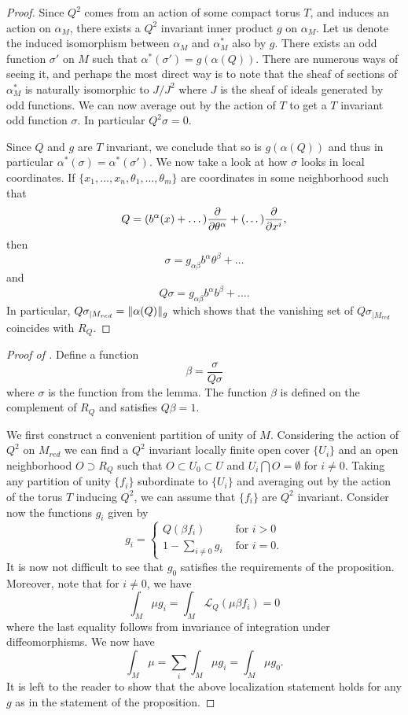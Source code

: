 \documentclass[11pt]{amsart}
\numberwithin{equation}{section}
\numberwithin{figure}{section}
\theoremstyle{plain}
\theoremstyle{definition}
\theoremstyle{remark}
\begin{document}
\begin{proof}
Since $Q^{2}$ comes from an action of some compact torus $T$, and
induces an action on $\alpha_{M}$, there exists a $Q^{2}$ invariant
inner product $g$ on $\alpha_{M}$. Let us denote the induced isomorphism
between $\alpha_{M}$ and $\alpha_{M}^{*}$ also by $g$. There exists
an odd function $\sigma'$ on $M$ such that $\alpha^{*}(\sigma')=g(\alpha(Q))$.
There are numerous ways of seeing it, and perhaps the most direct
way is to note that the sheaf of sections of $\alpha_{M}^{*}$ is
naturally isomorphic to $J/J^{2}$ where $J$ is the sheaf of ideals
generated by odd functions. We can now average out by the action of
$T$ to get a $T$ invariant odd function $\sigma$. In particular
$Q^{2}\sigma=0$.

Since $Q$ and $g$ are $T$ invariant, we conclude that so is $g(\alpha(Q))$
and thus in particular $\alpha^{*}(\sigma)=\alpha^{*}(\sigma')$.
We now take a look at how $\sigma$ looks in local coordinates. If
$\{x_{1},\dots,x_{n},\theta_{1},\dots,\theta_{m}\}$ are coordinates
in some neighborhood such that 
\[
Q=(b^{\alpha}(x)+\dots)\frac{\partial}{\partial\theta^{\alpha}}+(\dots)\frac{\partial}{\partial x^{i}},
\]
then 
\[
\sigma=g_{\alpha\beta}b^{\alpha}\theta^{\beta}+\dots
\]
and 
\[
Q\sigma=g_{\alpha\beta}b^{\alpha}b^{\beta}+\dots.
\]
In particular, $Q\sigma_{|M_{red}}=\lVert\alpha(Q)\rVert_{g}$ which shows
that the vanishing set of $Q\sigma_{|M_{red}}$ coincides with $R_{Q}$.
\end{proof}

\begin{proof}[Proof of ]
Define a function 
\[
\beta=\frac{\sigma}{Q\sigma}
\]
where $\sigma$ is the function from the lemma. The function $\beta$
is defined on the complement of $R_{Q}$ and satisfies $Q\beta=1$.

We first construct a convenient partition of unity of $M$. Considering
the action of $Q^{2}$ on $M_{red}$ we can find a $Q^{2}$ invariant
locally finite open cover $\{U_{i}\}$ and an open neighborhood $O\supset R_{Q}$
such that $O\subset U_{0}\subset U$ and $U_{i}\bigcap O=\emptyset$
for $i\neq0$. Taking any partition of unity $\{f_{i}\}$ subordinate
to $\{U_{i}\}$ and averaging out by the action of the torus $T$
inducing $Q^{2}$, we can assume that $\{f_{i}\}$ are $Q^{2}$ invariant.
Consider now the functions $g_{i}$ given by 
\[
g_{i}=\begin{cases}
Q(\beta f_{i}) & \mbox{ for }i>0\\
1-\sum_{i\neq0}g_{i} & \mbox{ for }i=0.
\end{cases}
\]
It is now not difficult to see that $g_{0}$ satisfies the requirements
of the proposition. Moreover, note that for $i\neq0$, we have 
\[
\int_{M}\mu g_{i}=\int_{M}\mathcal{L}_{Q}(\mu\beta f_{i})=0
\]
where the last equality follows from invariance of integration under
diffeomorphisms. We now have 
\[
\int_{M}\mu=\sum_{i}\int_{M}\mu g_{i}=\int_{M}\mu g_{0}.
\]
It is left to the reader to show that the above localization statement
holds for any $g$ as in the statement of the proposition. 
\end{proof}
\end{document}
